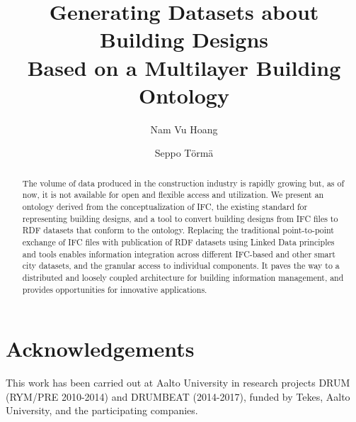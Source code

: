 \documentclass[envcountsame]{llncs}
\theoremstyle{principleStyle} \newtheorem{principle}{Principle}
\begin{document}
%
\frontmatter          %
%
\pagestyle{headings}  %
%


%
\title{Generating Datasets about Building Designs \\Based on a Multilayer Building Ontology}
%
%
\author{Nam Vu Hoang \and Seppo T\"orm\"a}
%
%

\maketitle              %

\begin{abstract}

The volume of data produced in the construction industry is rapidly growing but, as of now, it is not available for open and flexible access and utilization. We present an ontology derived from the conceptualization of IFC, the existing standard for representing building designs, and a tool to convert building designs from IFC files to RDF datasets that conform to the ontology. Replacing the traditional point-to-point exchange of IFC files with publication of RDF datasets using Linked Data principles and tools enables information integration across different IFC-based and other smart city datasets, and the granular access to individual components. It paves the way to a distributed and loosely coupled architecture for building information management, and provides opportunities for innovative applications. 


\end{abstract}






\section*{Acknowledgements}

This work has been carried out at Aalto University in research projects DRUM (RYM/PRE 2010-2014) and DRUMBEAT (2014-2017), funded by Tekes, Aalto University, and the participating companies. 




\clearpage
{} %
\renewcommand{\indexname}{Author Index}
\printindex
\clearpage
{} %
\renewcommand{\indexname}{Subject Index}
% 
\end{document}
